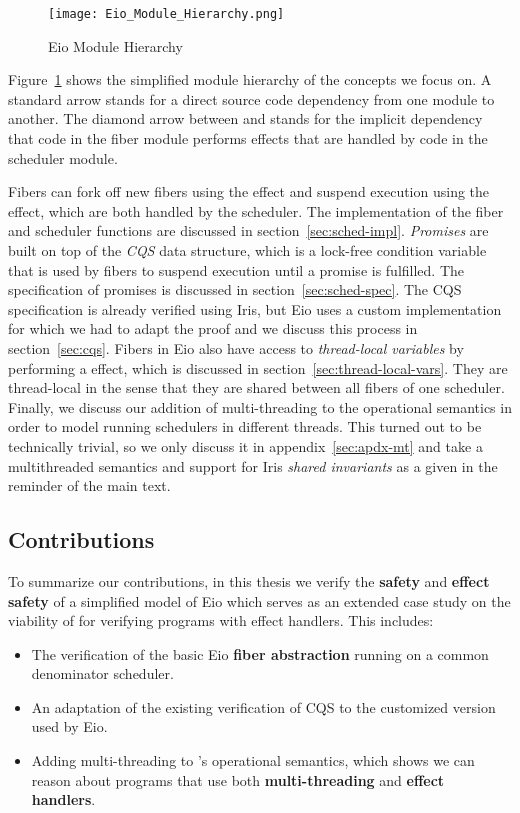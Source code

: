 \begin{figure}[ht]
  \centering
  \texttt{[image: Eio\_Module\_Hierarchy.png]}
  \caption{Eio Module Hierarchy}
  \label{fig:eio-module-hierarchy}
\end{figure}

Figure~\ref{fig:eio-module-hierarchy} shows the simplified module hierarchy of the concepts we focus on.
A standard arrow stands for a direct source code dependency from one module to another.
The diamond arrow between  and  stands for the implicit dependency that code in the fiber module performs effects that are handled by code in the scheduler module.

Fibers can fork off new fibers using the \efork{} effect and suspend execution using the \esuspend{} effect, which are both handled by the scheduler.
The implementation of the fiber and scheduler functions are discussed in section~\ref{sec:sched-impl}.
\emph{Promises} are built on top of the \emph{CQS} data structure, which is a lock-free condition variable that is used by fibers to suspend execution until a promise is fulfilled.
The specification of promises is discussed in section~\ref{sec:sched-spec}.
The CQS specification is already verified using Iris, but Eio uses a custom implementation for which we had to adapt the proof and we discuss this process in section~\ref{sec:cqs}.
Fibers in Eio also have access to \emph{thread-local variables} by performing a \egetctx{} effect, which is discussed in section~\ref{sec:thread-local-vars}.
They are thread-local in the sense that they are shared between all fibers of one scheduler.
Finally, we discuss our addition of multi-threading to the \hazel{} operational semantics in order to model running schedulers in different threads.
This turned out to be technically trivial, so we only discuss it in appendix~\ref{sec:apdx-mt} and take a multithreaded semantics and support for Iris \emph{shared invariants} as a given in the reminder of the main text.

\subsection{Contributions}
\label{sec:intro-contributions}

To summarize our contributions, in this thesis we verify the \textbf{safety} and \textbf{effect safety} of a simplified model of Eio which serves as an extended case study on the viability of \hazel{} for verifying programs with effect handlers.
This includes:

\begin{itemize}
  \item The verification of the basic Eio \textbf{fiber abstraction} running on a common denominator scheduler.
  \item An adaptation of the existing verification of CQS to the customized version used by Eio.
  \item Adding multi-threading to \hazel{}'s operational semantics, which shows we can reason about programs that use both \textbf{multi-threading} and \textbf{effect handlers}.
\end{itemize}

